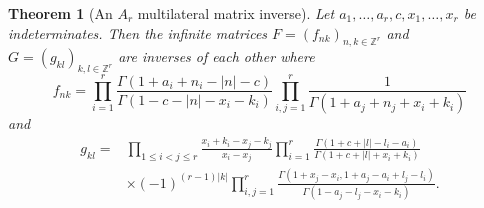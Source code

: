 \documentclass[reqno,12pt]{amsart}
\newtheorem{theorem}{Theorem}
\theoremstyle{remark}
\numberwithin{equation}{section}
\newcommand{\Ga}{\Gamma}
\begin{document}
\begin{theorem}[An $A_r$ multilateral matrix inverse]\label{thm:mmi}
Let $a_1,\ldots,a_r,c,x_1,\ldots,x_r$ be indeterminates. Then the infinite matrices
$F=(f_{nk})_{n,k\in\mathbb Z^r}$ and $G=(g_{kl})_{k,l\in\mathbb Z^r}$ are
\textit{inverses} of each other where
\begin{equation*}
f_{nk}=
\prod_{i=1}^r\frac{\Ga(1+a_i+n_i-|n|-c)}{\Ga(1-c-|n|-x_i-k_i)}
\prod_{i,j=1}^r\frac1{\Ga(1+a_j+n_j+x_i+k_i)}
\end{equation*}
and
\begin{align*}
g_{kl}={}&\prod_{1\le i<j\le r}\frac{x_i+k_i-x_j-k_j}{x_i-x_j}
\prod_{i=1}^r\frac{\Ga(1+c+|l|-l_i-a_i)}
{\Ga(1+c+|l|+x_i+k_i)}\\
&\times(-1)^{(r-1)|k|}\prod_{i,j=1}^r\frac{\Ga(1+x_j-x_i,1+a_j-a_i+l_j-l_i)}
{\Ga(1-a_j-l_j-x_i-k_i)}.
\end{align*}
\end{theorem}
\end{document}
